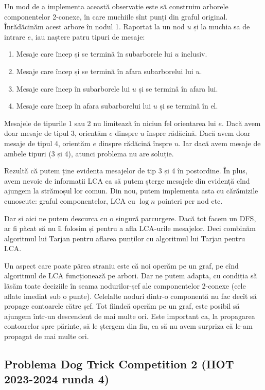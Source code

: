 \documentclass[../main.tex]{subfiles}
\begin{document}
Un mod de a implementa această observație este să construim arborele componentelor 2-conexe, în care muchiile sînt punți din graful original. Înrădăcinăm acest arbore în nodul 1. Raportat la un nod $u$ și la muchia sa de intrare $e$, iau naștere patru tipuri de mesaje:

\begin{enumerate}
  \item Mesaje care încep și se termină în subarborele lui $u$ inclusiv.
  \item Mesaje care încep și se termină în afara subarborelui lui $u$.
  \item Mesaje care încep în subarborele lui $u$ și se termină în afara lui.
  \item Mesaje care încep în afara subarborelui lui $u$ și se termină în el.
\end{enumerate}

Mesajele de tipurile 1 sau 2 nu limitează în niciun fel orientarea lui $e$. Dacă avem doar mesaje de tipul 3, orientăm $e$ dinspre $u$ înspre rădăcină. Dacă avem doar mesaje de tipul 4, orientăm $e$ dinspre rădăcină înspre $u$. Iar dacă avem mesaje de ambele tipuri (3 și 4), atunci problema nu are soluție.

Rezultă că putem ține evidența mesajelor de tip 3 și 4 în postordine. În plus, avem nevoie de informații LCA ca să putem șterge mesajele din evidență cînd ajungem la strămoșul lor comun. Din nou, putem implementa asta cu cărămizile cunoscute: graful componentelor, LCA cu $\log n$ pointeri per nod  etc.

Dar și aici ne putem descurca cu o singură parcurgere. Dacă tot facem un DFS, ar fi păcat să nu îl folosim și pentru a afla LCA-urile mesajelor. Deci combinăm algoritmul lui Tarjan pentru aflarea punților cu algoritmul lui Tarjan pentru LCA. 

Un aspect care poate părea straniu este că noi operăm pe un graf, pe cînd algoritmul de LCA funcționează pe arbori. Dar ne putem adapta, cu condiția să lăsăm toate deciziile în seama nodurilor-șef ale componentelor 2-conexe (cele aflate imediat sub o punte). Celelalte noduri dintr-o componentă nu fac decît să propage contoarele către șef. Tot fiindcă operăm pe un graf, este posibil să ajungem într-un descendent de mai multe ori. Este important ca, la propagarea contoarelor spre părinte, să le ștergem din fiu, ca să nu avem surpriza că le-am propagat de mai multe ori.

\subsection{Problema Dog Trick Competition 2 (IIOT 2023-2024 runda 4)}
\label{problem:dog-trick-competition-2}
\end{document}
